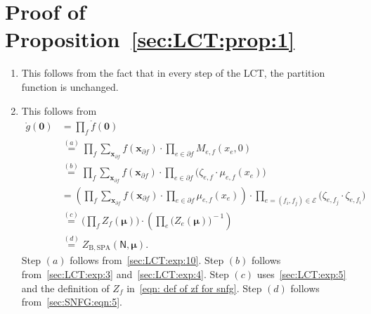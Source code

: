 \documentclass[journal]{IEEEtran}
\newcommand{\vect}[1]{ \bm{#1} }
\newcommand{\setEfull}{ \mathcal{E} }
\newcommand{\setpf}{ \partial f }
\newcommand{\vx}{ \vect{x} }
\newcommand{\vmu}{ \vect{ \mu } }
\newcommand{\graphN}{ \mathsf{N} }
\newcommand{\etof}{ e,f }
\newcommand{\ZBSPA}{ Z_{\mathrm{B,SPA}} }
\newcommand{\LCT}[1]{ \mathring{#1} }
\newcommand{\efi}{ e,f_i }
\newcommand{\efj}{ e,f_j }
\begin{document}
\begin{appendices}
\begin{enumerate}
  \end{enumerate}

  \section{Proof of Proposition~\ref{sec:LCT:prop:1}}
  \label{apx:property of SNFGs}

  \begin{enumerate}

    \item This follows from the fact that in every step of the LCT, the partition
          function is unchanged.

    \item This follows from
          \begin{align*}
            \LCT{g}(\vect{0})
             & = \prod_f
            \LCT{f}(\vect{0})                         \\
             & \overset{(a)}{=} \prod_f
            \sum_{\vx_{\setpf}}
            f(\vx_{\setpf})
            \cdot
            \prod_{e \in \setpf}
            M_{\etof}(x_{e}, 0)
            \\
             & \overset{(b)}{=} \prod_f
            \sum_{\vx_{\setpf}}
            f(\vx_{\setpf})
            \cdot
            \prod_{e \in \setpf}
            \bigl(
            \zeta_{\etof}
            \cdot
            \mu_{\etof}(x_{e})
            \bigr)
            \\
             & = \left(
            \prod_f
            \sum_{\vx_{\setpf}}
            f(\vx_{\setpf})
            \cdot
            \prod_{e \in \setpf}
            \mu_{\etof}(x_{e})
            \right)
            \cdot
            \!\!\!\!\!\!\!
            \prod_{e = (f_{i},f_{j}) \in \setEfull}
            \!\!\!\!\!\!\!\!
            \bigl(
            \zeta_{\efj}
            \!\cdot\!
            \zeta_{\efi}
            \bigr)                                    \\
             & \overset{(c)}{=}
            \Biggl(
            \prod_f
            Z_f( \vmu)
            \Biggr)
            \cdot
            \left(
            \prod_{e}
            \bigl( Z_e( \vmu) \bigr)^{\!\!-1}
            \right)                                   \\
             & \overset{(d)}{=} \ZBSPA(\graphN,\vmu).
          \end{align*}
          Step $(a)$ follows from~\eqref{sec:LCT:exp:10}.  Step $(b)$ follows
          from~\eqref{sec:LCT:exp:3} and~\eqref{sec:LCT:exp:4}.  Step $(c)$
          uses~\eqref{sec:LCT:exp:5} and the definition of $ Z_{f} $
          in~\eqref{eqn: def of zf for snfg}.  Step $(d)$ follows
          from~\eqref{sec:SNFG:eqn:5}.


\end{enumerate}
\end{appendices}
\end{document}
